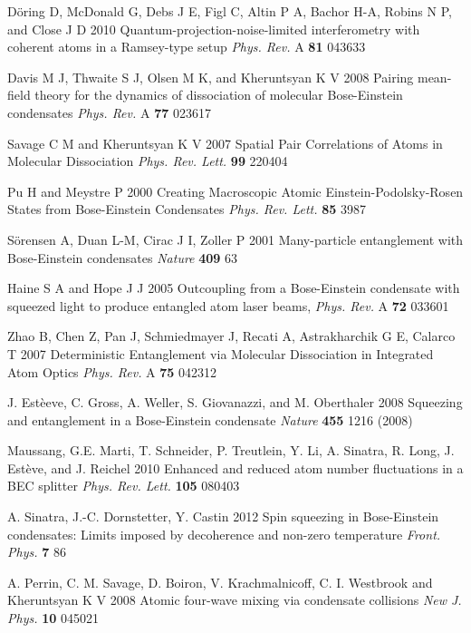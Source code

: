 \documentclass{iopart}
\begin{document}
\begin{thebibliography}{10}
 D{\"{o}}ring D, McDonald G, Debs J E, Figl C, Altin P A, Bachor H-A, Robins N P, and Close J D 2010 Quantum-projection-noise-limited interferometry with coherent atoms in a Ramsey-type setup \emph{Phys. Rev.} A {\bf 81} 043633

 Davis M J, Thwaite S J, Olsen M K, and Kheruntsyan K V 2008 Pairing mean-field theory for the dynamics of dissociation of molecular Bose-Einstein condensates \emph{Phys. Rev.} A {\bf 77} 023617

 Savage C M and Kheruntsyan K V 2007 Spatial Pair Correlations of Atoms in Molecular Dissociation \emph{Phys. Rev. Lett.} {\bf 99} 220404 

 Pu H and Meystre P 2000 Creating Macroscopic Atomic Einstein-Podolsky-Rosen States from Bose-Einstein Condensates \emph{Phys. Rev. Lett.} {\bf 85} 3987

 S{\"{o}}rensen A, Duan L-M, Cirac J I, Zoller P 2001 Many-particle entanglement with Bose-Einstein condensates \emph{Nature} {\bf 409} 63

 Haine S A and Hope J J 2005 Outcoupling from a Bose-Einstein condensate with squeezed light to produce entangled atom laser beams, \emph{Phys. Rev.} A {\bf 72} 033601

 Zhao B, Chen Z, Pan J, Schmiedmayer J, Recati A, Astrakharchik G E, Calarco T 2007 Deterministic Entanglement via Molecular Dissociation in Integrated Atom Optics \emph{Phys. Rev.} A {\bf 75} 042312

 J. Est{\`{e}}eve, C. Gross, A. Weller, S. Giovanazzi, and M. Oberthaler 2008 Squeezing and entanglement in a Bose-Einstein condensate \emph{Nature} {\bf 455} 1216 (2008)

 Maussang, G.E. Marti, T. Schneider, P. Treutlein, Y. Li, A. Sinatra, R. Long, J. Est{\`{e}}ve, and J. Reichel 2010 Enhanced and reduced atom number fluctuations in a BEC splitter \emph{Phys. Rev. Lett.} {\bf 105} 080403

 A. Sinatra, J.-C. Dornstetter, Y. Castin 2012 Spin squeezing in Bose-Einstein condensates: Limits imposed by decoherence and non-zero temperature \emph{Front. Phys.} {\bf 7} 86

 A. Perrin, C. M. Savage, D. Boiron, V. Krachmalnicoff, C. I. Westbrook and Kheruntsyan K V 2008 Atomic four-wave mixing via condensate collisions \emph{New J. Phys.} {\bf 10} 045021


\end{thebibliography}
\end{document}
